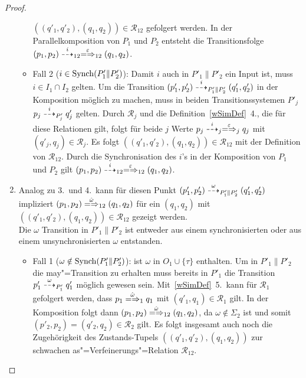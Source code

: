\begin{proof}
\begin{enumerate}
\begin{itemize}
          $((q'_1,q'_2),(q_1,q_2)) \in \mathcal{R}_{12}$ gefolgert werden. In
          der Parallelkomposition von $P_1$ und $P_2$ entsteht die
          Transitionsfolge $(p_1,p_2)\may[i]_{12} \weakmay[\varepsilon]_{12}
          (q_1,q_2)$.
        \item Fall 2 ($i\in\mathrm{Synch} (P'_1\|P'_2)$): Damit $i$ auch in
          $P'_1\|P'_2$ ein Input ist, muss $i\in I_1\cap I_2$ gelten. Um die
          Transition $(p'_1,p'_2)\may[i]_{P'_1\|P'_2}(q'_1,q'_2)$ in der
          Komposition möglich zu machen, muss in beiden Transitionssystemen
          $P'_j$ $p_j \may[i]_{P'_j} q'_j$ gelten. Durch $\mathcal{R}_j$ und
          die Definition~\ref{wSimDef}~4., die für diese Relationen gilt, folgt
          für beide $j$ Werte $p_j\may[i]_j \weakmay[\varepsilon]_j q_j$ mit
          $(q'_j,q_j)\in\mathcal{R}_j$. Es folgt $((q'_1,q'_2),(q_1,q_2)) \in
          \mathcal{R}_{12}$ mit der Definition von $\mathcal{R}_{12}$. Durch
          die Synchronisation des $i$'s in der Komposition von $P_1$ und $P_2$
          gilt $(p_1,p_2) \may[i]_{12} \weakmay[\varepsilon]_{12} (q_1,q_2)$.
      \end{itemize}
    \item Analog zu 3.\ und 4.\ kann für diesen Punkt $(p'_1,p'_2)
      \may[\omega]_{P'_1\|P'_2} (q'_1,q'_2)$ impliziert $(p_1,p_2)
      \weakmay[\hat{\omega}]_{12} (q_1,q_2)$ für ein $(q_1,q_2)$ mit
      $((q'_1,q'_2),(q_1,q_2))\in\mathcal{R}_{12}$ gezeigt werden.\\
      Die $\omega$ Transition in $P'_1\|P'_2$ ist entweder aus einem
      synchronisierten oder aus einem unsynchronisierten $\omega$ entstanden.
      \begin{itemize}
        \item Fall 1 ($\omega\notin\mathrm{Synch} (P'_1\|P'_2)$): \OBdA{} ist $\omega$
          in $O_1\cup\{\tau\}$ enthalten. Um in $P'_1\|P'_2$ die
          may"=Transition zu erhalten muss bereits in $P'_1$ die Transition
          $p'_1 \may[\omega]_{P'_1} q'_1$ möglich gewesen sein.
          Mit~\ref{wSimDef}~5.\ kann für $\mathcal{R}_1$ gefolgert werden, dass
          $p_1 \weakmay[\hat{\omega}]_1 q_1$ mit $(q'_1,q_1)\in\mathcal{R}_1$
          gilt. In der Komposition folgt dann $(p_1,p_2)
          \weakmay[\hat{\omega}]_{12} (q_1,q_2)$, da $\omega\notin \Sigma _2$
          ist und somit $(p'_2,p_2)=(q'_2,q_2)\in\mathcal{R}_2$ gilt. Es folgt
          insgesamt auch noch die Zugehörigkeit des Zustands-Tupels
          $((q'_1,q'_2),(q_1,q_2))$ zur schwachen as"=Verfeinerungs"=Relation
          $\mathcal{R}_{12}$.

\end{itemize}
\end{enumerate}
\end{proof}
